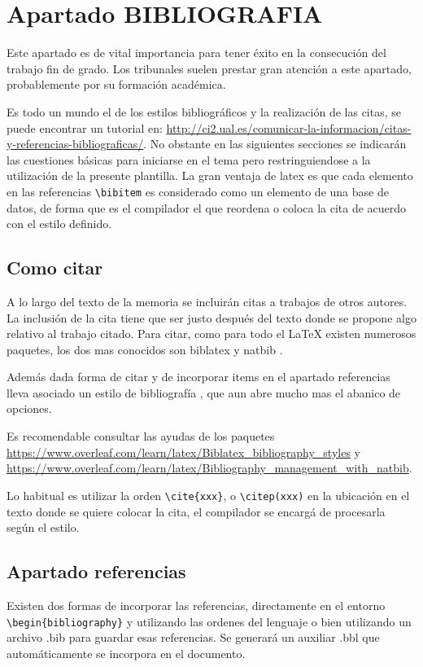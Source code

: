 
 \chapter{Apartado BIBLIOGRAFIA}
 Este apartado es de vital importancia para tener éxito en la consecución del trabajo fin de grado. Los tribunales suelen prestar gran atención a este apartado, probablemente por su formación académica. 
 
 Es todo un mundo el de los estilos bibliográficos y la realización de las citas, se puede encontrar un tutorial en:  \url{http://ci2.ual.es/comunicar-la-informacion/citas-y-referencias-bibliograficas/}. No obstante en las siguientes secciones se indicarán las cuestiones básicas para iniciarse en el tema pero restringuiendose a la utilización de la presente plantilla. La gran ventaja de latex es que cada elemento en las referencias   \lstinline[language=enparrafo]!\bibitem! es considerado como un elemento de una base de datos, de forma que es el compilador el que reordena o coloca la cita de acuerdo con el estilo definido.

 \section{Como citar}
A lo largo del texto de la memoria se incluirán citas a trabajos de otros autores. La inclusión de la cita tiene que ser justo después del texto donde se propone algo relativo al trabajo citado. Para citar, como para todo el \LaTeX{} existen numerosos paquetes, los dos mas conocidos son  biblatex y   natbib . 

Además dada forma de citar y de incorporar items en el apartado referencias lleva asociado un estilo de bibliografía    \lstinline[language=enparrafo]!!, que aun abre mucho mas el abanico de opciones. 

Es recomendable consultar las ayudas de los paquetes \url{https://www.overleaf.com/learn/latex/Biblatex_bibliography_styles} y \url{https://www.overleaf.com/learn/latex/Bibliography_management_with_natbib}.

Lo habitual es utilizar la orden      \lstinline[language=enparrafo]!\cite{xxx}!, o   \lstinline[language=enparrafo]!\citep(xxx)!  en la ubicación en el texto donde se quiere colocar la cita, el compilador se encargá de procesarla según el estilo.

 \section {Apartado referencias}
  Existen dos formas de incorporar las referencias, directamente en el entorno   \lstinline[language=enparrafo]!\begin{bibliography}! y utilizando las ordenes del lenguaje o bien utilizando un archivo .bib para guardar esas referencias. Se generará un auxiliar .bbl que automáticamente se incorpora en el documento.
  
